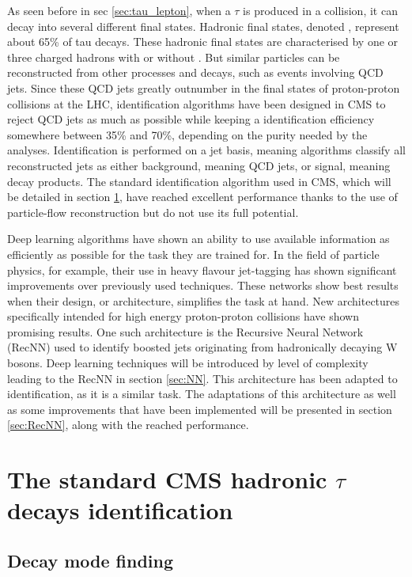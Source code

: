 
As seen before in sec \ref{sec:tau_lepton}, when a $\tau$ is produced in a collision, it can decay into several different final states.
Hadronic final states, denoted \tauh, represent about 65\% of tau decays.
These hadronic final states are characterised by one or three charged hadrons with or without \pizero . But similar particles can be reconstructed from other processes and decays, such as events involving QCD jets.
Since these QCD jets greatly outnumber \tauh in the final states of proton-proton collisions at the LHC, \tauh identification algorithms have been designed in CMS to reject QCD jets as much as possible while keeping a \tauh identification efficiency somewhere between 35\% and 70\%, depending on the purity needed by the analyses. Identification is performed on a jet basis, meaning algorithms classify all reconstructed jets as either background, meaning QCD jets, or signal, meaning \tauh decay products.
The standard \tauh identification algorithm used in CMS, which will be detailed in section \ref{sec:std_tau_id}, have reached excellent performance thanks to the use of particle-flow reconstruction but do not use its full potential. 

Deep learning algorithms have shown an ability to use available information as efficiently as possible for the task they are trained for. In the field of particle physics, for example, their use in heavy flavour jet-tagging \cite{btagging_NN} has shown significant improvements over previously used techniques. These networks show best results when their design, or architecture, simplifies the task at hand. New architectures specifically intended for high energy proton-proton collisions have shown promising results. One such architecture is the Recursive Neural Network (RecNN) \cite{Louppe:2017ipp} used to identify boosted jets originating from hadronically decaying W bosons. Deep learning techniques will be introduced by level of complexity leading to the RecNN in section \ref{sec:NN}. This architecture has been adapted to \tauh identification, as it is a similar task. The adaptations of this architecture as well as some improvements that have been implemented will be presented in section \ref{sec:RecNN}, along with the reached performance.

\section{The standard CMS hadronic $\tau$ decays identification}
\label{sec:std_tau_id}
\subsection{Decay mode finding}

